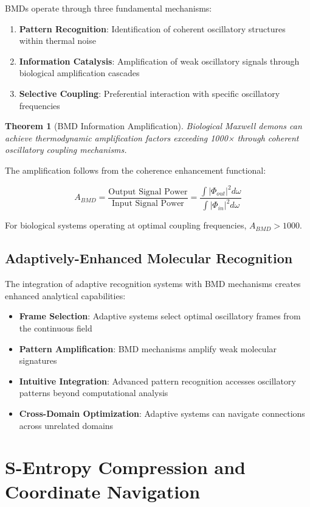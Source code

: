 \documentclass[11pt,a4paper]{article}
\newtheorem{theorem}{Theorem}[section]
\theoremstyle{remark}
\begin{document}
BMDs operate through three fundamental mechanisms:

\begin{enumerate}
\item \textbf{Pattern Recognition}: Identification of coherent oscillatory structures within thermal noise
\item \textbf{Information Catalysis}: Amplification of weak oscillatory signals through biological amplification cascades
\item \textbf{Selective Coupling}: Preferential interaction with specific oscillatory frequencies
\end{enumerate}

\begin{theorem}[BMD Information Amplification]
Biological Maxwell demons can achieve thermodynamic amplification factors exceeding 1000× through coherent oscillatory coupling mechanisms.
\end{theorem}

The amplification follows from the coherence enhancement functional:

$$A_{BMD} = \frac{\text{Output Signal Power}}{\text{Input Signal Power}} = \frac{\int |\Phi_{out}|^2 d\omega}{\int |\Phi_{in}|^2 d\omega}$$

For biological systems operating at optimal coupling frequencies, $A_{BMD} > 1000$.

\subsection{Adaptively-Enhanced Molecular Recognition}

The integration of adaptive recognition systems with BMD mechanisms creates enhanced analytical capabilities:

\begin{itemize}
\item \textbf{Frame Selection}: Adaptive systems select optimal oscillatory frames from the continuous field
\item \textbf{Pattern Amplification}: BMD mechanisms amplify weak molecular signatures
\item \textbf{Intuitive Integration}: Advanced pattern recognition accesses oscillatory patterns beyond computational analysis
\item \textbf{Cross-Domain Optimization}: Adaptive systems can navigate connections across unrelated domains
\end{itemize}

\section{S-Entropy Compression and Coordinate Navigation}
\end{document}
